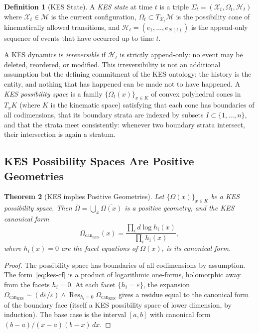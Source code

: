 \documentclass[12pt, oneside]{amsart}
\theoremstyle{plain}
\newtheorem{theorem}{Theorem}[section]
\theoremstyle{definition}
\newtheorem{definition}[theorem]{Definition}
\theoremstyle{remark}
\DeclareMathOperator{\Res}{Res}
\newcommand{\eps}{\varepsilon}
\newcommand{\XKS}{\mathcal{X}}
\newcommand{\OmKS}{\Omega}
\newcommand{\HKS}{\mathcal{H}}
\newcommand{\CF}{\Omega_{\mathrm{can}}}
\begin{document}
\begin{definition}[KES State]
A \emph{KES state} at time $t$ is a triple $\Sigma_t = (\XKS_t, \OmKS_t, \HKS_t)$ where $\XKS_t \in \mathcal{M}$ is the current configuration, $\OmKS_t \subset T_{\XKS_t}\mathcal{M}$ is the possibility cone of kinematically allowed transitions, and $\HKS_t = (e_1, \ldots, e_{N(t)})$ is the append-only sequence of events that have occurred up to time $t$.
\end{definition}

A KES dynamics is \emph{irreversible} if $\HKS_t$ is strictly append-only: no event may be deleted, reordered, or modified. This irreversibility is not an additional assumption but the defining commitment of the KES ontology: the history is the entity, and nothing that has happened can be made not to have happened. A \emph{KES possibility space} is a family $\{\OmKS_t(x)\}_{x \in K}$ of convex polyhedral cones in $T_x K$ (where $K$ is the kinematic space) satisfying that each cone has boundaries of all codimensions, that its boundary strata are indexed by subsets $I \subset \{1,\ldots,n\}$, and that the strata meet consistently: whenever two boundary strata intersect, their intersection is again a stratum.

\subsection{KES Possibility Spaces Are Positive Geometries}

\begin{theorem}[KES implies Positive Geometries]
\label{thm:kes-pg}
Let $\{\OmKS(x)\}_{x \in K}$ be a KES possibility space. Then $\overline{\OmKS} = \bigcup_{x} \overline{\OmKS(x)}$ is a positive geometry, and the KES canonical form
\begin{equation}
\label{eq:kes-cf}
  \CF_{\mathrm{KES}}(x) = \frac{\prod_i d\log h_i(x)}{\prod_i h_i(x)},
\end{equation}
where $h_i(x) = 0$ are the facet equations of $\OmKS(x)$, is its canonical form.
\end{theorem}

\begin{proof}
The possibility space has boundaries of all codimensions by assumption. The form~\eqref{eq:kes-cf} is a product of logarithmic one-forms, holomorphic away from the facets $h_i = 0$. At each facet $\{h_i = \eps\}$, the expansion $\CF_{\mathrm{KES}} \sim (d\eps/\eps) \wedge \Res_{h_i = 0}\CF_{\mathrm{KES}}$ gives a residue equal to the canonical form of the boundary face (itself a KES possibility space of lower dimension, by induction). The base case is the interval $[a,b]$ with canonical form $(b-a)/(x-a)(b-x) \, dx$.
\end{proof}
\end{document}
